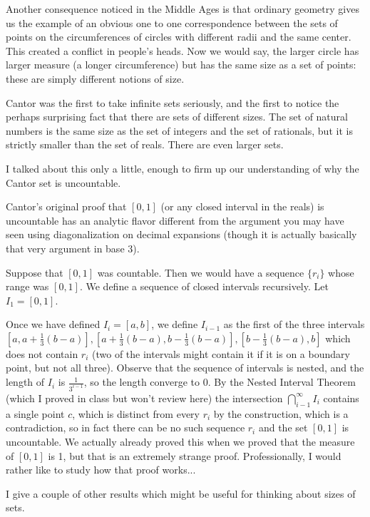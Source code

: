 \documentclass[12pt]{article}
\begin{document}
Another consequence noticed in the Middle Ages is that ordinary geometry gives us the example of an obvious one to one correspondence between the sets of points on the circumferences of circles with different radii and the same center.  This created a conflict in people's heads.  Now we would say, the larger circle has larger measure (a longer circumference) but has the same size as a set of points:  these are simply different notions of size.

Cantor was the first to take infinite sets seriously, and the first to notice the perhaps surprising fact that there are sets of different sizes.  The set of natural numbers is the same size as the set of integers and the set of rationals, but it is strictly smaller than the set of reals.   There are even larger sets.

I talked about this only a little, enough to firm up our understanding of why the Cantor set is uncountable.

Cantor's original proof that $[0,1]$ (or any closed interval in the reals) is uncountable has an analytic flavor different from the argument you may have seen using diagonalization on decimal expansions
(though it is actually basically that very argument in base 3).

Suppose that $[0,1]$ was countable.  Then we would have a sequence $\{r_i\}$ whose range was $[0,1]$.  We define a sequence of closed intervals recursively.  Let $I_1=[0,1]$.

Once we have defined $I_i = [a,b]$, we define $I_{i-1}$ as the first of the three intervals $[a,a+\frac13(b-a)],[a+\frac13(b-a),b-\frac13(b-a)],[b-\frac13(b-a),b]$ which does not contain $r_i$ (two of the intervals might contain it if it is on a boundary point, but not all three).  Observe that the sequence of intervals is nested, and the length of $I_i$ is $\frac1{3^{i-1}}$, so the length converge to 0.
By the Nested Interval Theorem (which I proved in class but won't review here) the intersection $\bigcap_{i-1}^\infty I_i$ contains a single point $c$, which is distinct from every $r_i$ by the construction, which is a contradiction, so in fact there can be no such sequence $r_i$ and the set $[0,1]$ is uncountable.  We actually already proved this when we proved that the measure of $[0,1]$ is 1, but that is an extremely strange proof.  Professionally, I would rather like to study how that proof works...

I give a couple of other results which might be useful for thinking about sizes of sets.\
\end{document}
